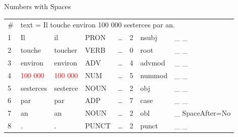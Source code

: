 \documentclass[10pt, compress, aspectratio=169]{beamer}
\begin{document}
\begin{frame}{Numbers with Spaces}
\begin{tabular}{l l l l l l l l}
\# & \multicolumn{7}{l}{text = Il touche environ 100 000 sesterces par an.} \\
1 & Il & il & PRON & \dots & 2 & nsubj & \_ \_ \\
2 & touche & toucher & VERB & \dots & 0 & root & \_ \_ \\
3 & environ & environ & ADV & \dots & 4 & advmod & \_ \_ \\
4 & \textcolor{red}{100 000} & \textcolor{red}{100 000} & NUM & \dots & 5 & nummod & \_ \_ \\
5 & sesterces & sesterce & NOUN & \dots & 2 & obj & \_ \_ \\
6 & par & par & ADP & \dots & 7 & case & \_ \_ \\
7 & an & an & NOUN & \dots & 2 & obl & \_ SpaceAfter=No \\
8 & . & . & PUNCT & \dots & 2 & punct & \_ \_ \\
\end{tabular}
\end{frame}

\end{document}
